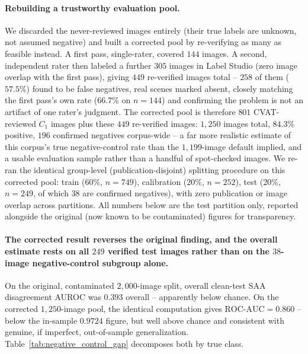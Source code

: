 \documentclass[12pt,a4paper]{report}
\begin{document}
\paragraph{Rebuilding a trustworthy evaluation pool.} We discarded the never-reviewed images entirely (their true labels are unknown, not assumed negative) and built a corrected pool by re-verifying as many as feasible instead. A first pass, single-rater, covered $144$ images. A second, independent rater then labeled a further $305$ images in Label Studio (zero image overlap with the first pass), giving $449$ re-verified images total -- $258$ of them ($57.5\%$) found to be false negatives, real scenes marked absent, closely matching the first pass's own rate ($66.7\%$ on $n=144$) and confirming the problem is not an artifact of one rater's judgment. The corrected pool is therefore $801$ CVAT-reviewed $C_1$ images plus these $449$ re-verified images: $1{,}250$ images total, $84.3\%$ positive, $196$ confirmed negatives corpus-wide -- a far more realistic estimate of this corpus's true negative-control rate than the $1{,}199$-image default implied, and a usable evaluation sample rather than a handful of spot-checked images. We re-ran the identical group-level (publication-disjoint) splitting procedure on this corrected pool: train ($60\%$, $n=749$), calibration ($20\%$, $n=252$), test ($20\%$, $n=249$, of which $38$ are confirmed negatives), with zero publication or image overlap across partitions. All numbers below are the test partition only, reported alongside the original (now known to be contaminated) figures for transparency.

\paragraph{The corrected result reverses the original finding, and the overall estimate rests on all $249$ verified test images rather than on the $38$-image negative-control subgroup alone.} On the original, contaminated $2{,}000$-image split, overall clean-test SAA disagreement AUROC was $0.393$ overall -- apparently below chance. On the corrected $1{,}250$-image pool, the identical computation gives $\text{ROC-AUC}=0.860$ -- below the in-sample $0.9724$ figure, but well above chance and consistent with genuine, if imperfect, out-of-sample generalization. Table~\ref{tab:negative_control_gap} decomposes both by true class.
\end{document}
